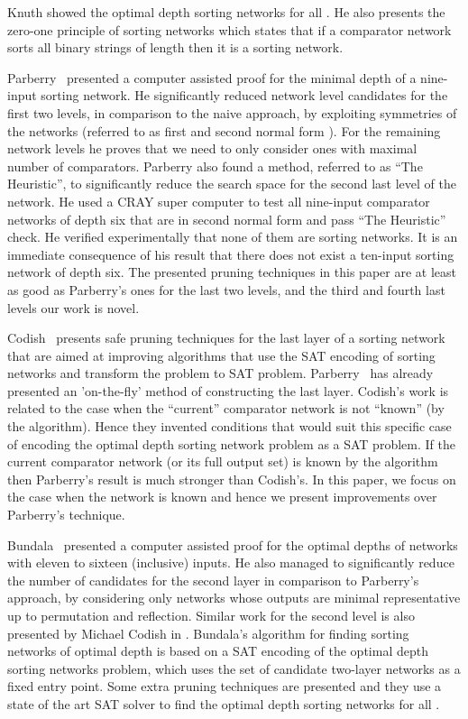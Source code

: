 \documentclass[13pt,a4paper]{article}
\begin{document}
Knuth \cite{Knuth73} showed the optimal depth sorting networks for all . He also presents the zero-one principle of sorting networks which states that if a comparator network sorts all  binary strings of length  then it is a sorting network.

Parberry~\cite{Parberry89} presented a computer assisted proof for the minimal depth of a nine-input sorting network. He significantly reduced network level candidates for the first two levels, in comparison to the naive approach, by exploiting symmetries of the networks (referred to as first and second normal form \cite{Parberry89}). For the remaining network levels he proves that we need to only consider ones with maximal number of comparators. Parberry also found a method, referred to as ``The Heuristic'', to significantly reduce the search space for the second last level of the network. He used a CRAY super computer to test all nine-input comparator networks of depth six that are in second normal form and pass ``The Heuristic'' check. He verified experimentally that none of them are sorting networks. It is an immediate consequence of his result that there does not exist a ten-input sorting network of depth six. The presented pruning techniques in this paper are at least as good as Parberry's ones for the last two levels, and the third and fourth last levels our work is novel.

Codish~\cite{CodishCS14a_The_End_Game} presents safe pruning techniques for the last layer of a sorting network that are aimed at improving algorithms that use the SAT encoding of sorting networks and transform the problem to SAT problem. Parberry~\cite{Parberry89} has already presented an 'on-the-fly' method of constructing the last layer. Codish's work is related to the case when the ``current'' comparator network is not ``known'' (by the algorithm). Hence they invented conditions that would suit this specific case of encoding the optimal depth sorting network problem as a SAT problem.  If the current comparator network (or its full output set) is known by the algorithm then Parberry's result is much stronger than Codish's. In this paper, we focus on the case when the network is known and hence we present improvements over Parberry's technique.

Bundala~\cite{BundalaCCSZ14_Optimal_Depth} presented a computer assisted proof for the optimal depths of networks with eleven to sixteen (inclusive) inputs. He also managed to significantly reduce the number of candidates for the second layer in comparison to Parberry's approach, by considering only networks whose outputs are minimal representative up to permutation and reflection. Similar work for the second level is also presented by Michael Codish in \cite{CodishCS14:Two_Layer_Prefix}. Bundala's algorithm for finding sorting networks of optimal depth is based on a SAT encoding of the optimal depth sorting networks problem, which uses the set of candidate two-layer networks as a fixed entry point. Some extra pruning techniques are presented and they use a state of the art SAT solver to find the optimal depth sorting networks for all . 
\end{document}
